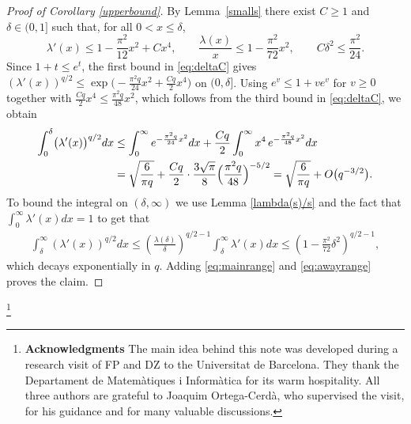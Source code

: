 \documentclass[11pt, a4paper, reqno]{amsart}
\theoremstyle{remark}
\begin{document}
\begin{proof}[Proof of Corollary \ref{upperbound}]
    By Lemma~\ref{smalls} there exist $C\geq 1$ and $\delta\in(0,1]$ such that, for all $0<x\leq\delta$,
\begin{equation}\label{eq:deltaC}
\lambda'(x)\leq 1-\frac{\pi^{2}}{12}x^{2}+Cx^{4},
\qquad
\frac{\lambda(x)}{x}\leq 1-\frac{\pi^{2}}{72}x^{2},
\qquad
C\delta^{2}\leq\frac{\pi^{2}}{24}.
\end{equation}
Since $1+t\leq e^{t}$, the first bound in \eqref{eq:deltaC} gives
$(\lambda'(x))^{q/2}\leq \exp\bigl(-\tfrac{\pi^{2}q}{24}x^{2}+\tfrac{Cq}{2}x^{4}\bigr)$
on $(0,\delta]$. Using $e^{v}\leq 1+ve^{v}$ for $v\geq 0$ together with
$\tfrac{Cq}{2}x^{4}\leq \tfrac{\pi^{2}q}{48}x^{2}$, which follows from the third bound
in \eqref{eq:deltaC}, we obtain
\begin{align}
\int_{0}^{\delta}\bigl(\lambda'(x)\bigr)^{q/2}dx
&\leq \int_{0}^{\infty} e^{-\frac{\pi^{2}q}{24}x^{2}}dx
	+\frac{Cq}{2}\int_{0}^{\infty} x^{4}\,e^{-\frac{\pi^{2}q}{48}x^{2}}dx \notag\\
&= \sqrt{\frac{6}{\pi q}}
	+\frac{Cq}{2}\cdot\frac{3\sqrt{\pi}}{8}\Bigl(\frac{\pi^{2}q}{48}\Bigr)^{-5/2}
= \sqrt{\frac{6}{\pi q}}+O\bigl(q^{-3/2}\bigr).
\label{eq:mainrange}
\end{align}
To bound the integral on $(\delta, \infty)$ we use Lemma \ref{lambda(s)/s} and the fact that $\int_{0}^{\infty} \lambda'(x)dx = 1$ to get that
\begin{align}\label{eq:awayrange}
    \int_{\delta}^{\infty}\left(\lambda'(x)\right)^{q/2}dx \leq \left(\frac{\lambda(\delta)}{\delta}\right)^{q/2-1} \int_{\delta}^{\infty} \lambda'(x)dx \leq \left(1-\frac{\pi^2}{72}\delta^2\right)^{q/2-1},
\end{align}
which decays exponentially in $q$.
Adding \eqref{eq:mainrange} and
\eqref{eq:awayrange} proves the claim.
\end{proof}

\thanks{\textbf{Acknowledgments} The main idea behind this note was developed during a research visit of FP and DZ to the Universitat de Barcelona. They thank the Departament de Matemàtiques i Informàtica for its warm hospitality. All three authors are grateful to Joaquim Ortega-Cerdà, who supervised the visit, for his guidance and for many valuable discussions. }

% 

\end{document}
